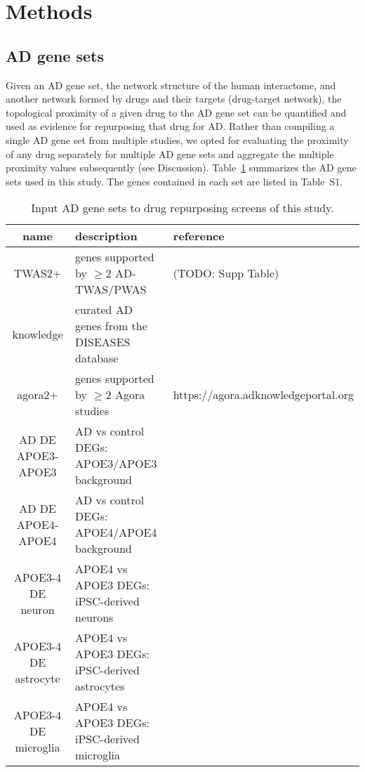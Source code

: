 \documentclass[letterpaper]{article}
\begin{document}
\section{Methods}

\subsection{AD gene sets}

Given an AD gene set, the network structure of the human interactome, and
another network formed by drugs and their targets (drug-target network), the
topological proximity of a given drug to the AD gene set can be
quantified\citep{Guney2016} and used as evidence for repurposing that drug for
AD.  Rather than compiling a single AD gene set from multiple studies, we
opted for evaluating the proximity of any drug separately for multiple AD gene
sets and aggregate the multiple proximity values subsequently (see
Discussion).  Table~\ref{tab:genesets} summarizes the AD gene sets used in
this study.  The genes contained in each set are listed in Table~S1.

\begin{table}
\footnotesize
\begin{tabular}{cll}
name     & description & reference  \\
\hline
TWAS2+   & genes supported by $\ge 2$ AD-TWAS/PWAS & (TODO: Supp Table)  \\
knowledge& curated AD genes from the DISEASES database & \cite{PletscherFrankild2015} \\
agora2+  & genes supported by $\ge 2$ Agora studies & https://agora.adknowledgeportal.org \\
AD DE APOE3-APOE3 & AD vs control DEGs: APOE3/APOE3 background & \cite{Taubes2021} \\
AD DE APOE4-APOE4 & AD vs control DEGs: APOE4/APOE4 background & \cite{Taubes2021} \\
APOE3-4 DE neuron & APOE4 vs APOE3 DEGs: iPSC-derived neurons& \cite{Lin2018} \\
APOE3-4 DE astrocyte & APOE4 vs APOE3 DEGs: iPSC-derived astrocytes& \cite{Lin2018} \\
APOE3-4 DE microglia & APOE4 vs APOE3 DEGs: iPSC-derived microglia& \cite{Lin2018} \\
\end{tabular}
\caption{
Input AD gene sets to drug repurposing screens of this study.
}
\label{tab:genesets}
\end{table}
\end{document}
